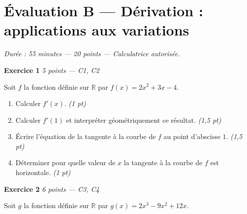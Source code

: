 
\section*{Évaluation B — Dérivation : applications aux variations}

\textit{Durée : 55 minutes — 20 points — Calculatrice autorisée.}

\bigskip

\textbf{Exercice 1} \hfill \textit{5 points — C1, C2}

Soit $f$ la fonction définie sur $\mathbb{R}$ par $f(x) = 2x^2 + 3x - 4$.

\begin{enumerate}
  \item Calculer $f'(x)$. \hfill \textit{(1 pt)}
  \item Calculer $f'(1)$ et interpréter géométriquement ce résultat. \hfill \textit{(1,5 pt)}
  \item Écrire l'équation de la tangente à la courbe de $f$ au point d'abscisse $1$. \hfill \textit{(1,5 pt)}
  \item Déterminer pour quelle valeur de $x$ la tangente à la courbe de $f$ est horizontale. \hfill \textit{(1 pt)}
\end{enumerate}


\bigskip

\textbf{Exercice 2} \hfill \textit{6 points — C3, C4}

Soit $g$ la fonction définie sur $\mathbb{R}$ par $g(x) = 2x^3 - 9x^2 + 12x$.

